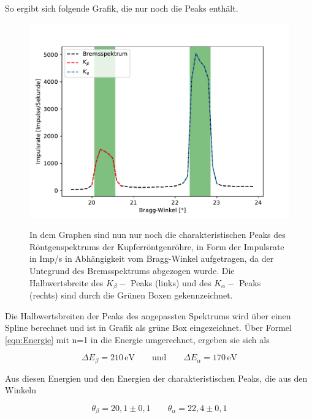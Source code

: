 \documentclass[titlepage = firstcover]{scrartcl}
\begin{document}
            \noindent
            So ergibt sich folgende Grafik, die nur noch die Peaks enthält.
            \FloatBarrier
            \begin{figure}[h]
              \centering
              \caption{In dem Graphen sind nun nur noch die charakteristischen Peaks des Röntgenspektrums der Kupferröntgenröhre, in Form der Impulsrate in Imp/s in Abhängigkeit vom Bragg-Winkel aufgetragen, da der Untegrund des Bremsspektrums abgezogen wurde. Die Halbwertsbreite des $K_{\beta}-$ Peaks (links) und des $K_{\alpha}-$ Peaks (rechts) sind durch die Grünen Boxen gekennzeichnet.}
              \includegraphics{Peaks_Cu.pdf}
              \label{fig:graphpeak}
            \end{figure}
            \FloatBarrier
            \noindent
            Die Halbwertsbreiten der Peaks des angepassten Spektrums wird über einen Spline berechnet und ist in Grafik als grüne Box eingezeichnet. Über Formel \ref{eqn:Energie} mit n=1 in die 
            Energie umgerechnet, ergeben sie sich als 

            \begin{equation*}
              \Delta E_{\beta} = 210 \, \text{eV} \qquad \text{und} \qquad \Delta E_{\alpha} = 170 \, \text{eV}
              \label{eqn:Breiten}
            \end{equation*}
            
            \noindent
            Aus diesen Energien und den Energien der charakteristischen Peaks, die aus den Winkeln

            \begin{equation*}
              \theta_{\beta} = 20,1 \pm 0,1     \qquad \theta_{\alpha} = 22,4 \pm 0,1
            \end{equation*}
\end{document}
